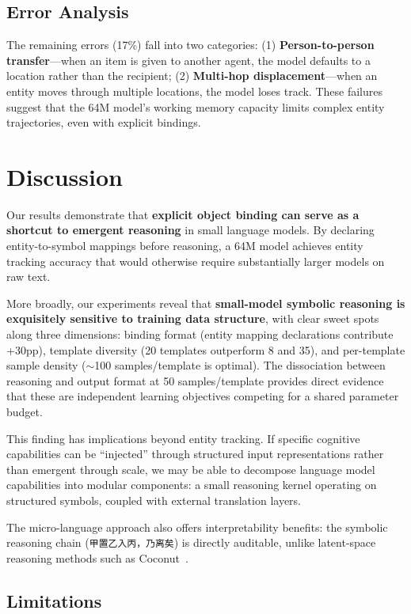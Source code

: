 \documentclass[11pt,a4paper]{article}
\begin{document}
\subsection{Error Analysis}

The remaining errors (17\%) fall into two categories:
(1) \textbf{Person-to-person transfer}—when an item is given to another agent, the model defaults to a location rather than the recipient;
(2) \textbf{Multi-hop displacement}—when an entity moves through multiple locations, the model loses track.
These failures suggest that the 64M model's working memory capacity limits complex entity trajectories, even with explicit bindings.

\section{Discussion}

Our results demonstrate that \textbf{explicit object binding can serve as a shortcut to emergent reasoning} in small language models.
By declaring entity-to-symbol mappings before reasoning, a 64M model achieves entity tracking accuracy that would otherwise require substantially larger models on raw text.

More broadly, our experiments reveal that \textbf{small-model symbolic reasoning is exquisitely sensitive to training data structure}, with clear sweet spots along three dimensions: binding format (entity mapping declarations contribute +30pp), template diversity (20 templates outperform 8 and 35), and per-template sample density ($\sim$100 samples/template is optimal). The dissociation between reasoning and output format at 50 samples/template provides direct evidence that these are independent learning objectives competing for a shared parameter budget.

This finding has implications beyond entity tracking.
If specific cognitive capabilities can be ``injected'' through structured input representations rather than emergent through scale, we may be able to decompose language model capabilities into modular components: a small reasoning kernel operating on structured symbols, coupled with external translation layers.

The micro-language approach also offers interpretability benefits: the symbolic reasoning chain (\texttt{甲置乙入丙，乃离矣}) is directly auditable, unlike latent-space reasoning methods such as Coconut~\cite{hao2024coconut}.

\subsection{Limitations}
\end{document}
